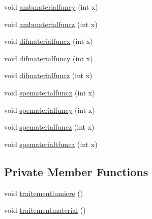 \begin{DoxyCompactItemize}
void \hyperlink{class_mondock_abab8b7116db8f4d8a45f97bbccfea28a}{ambmaterialfuncy} (int x)
\item 
void \hyperlink{class_mondock_aef75cf8b1bb4a9cf7e6f6a04ac9a6e53}{ambmaterialfuncz} (int x)
\item 
void \hyperlink{class_mondock_ab52fa4e602f9dd7686b4beaee1ae78a7}{difmaterialfuncx} (int x)
\item 
void \hyperlink{class_mondock_acb6ef6ce35644055c6782614193c0abf}{difmaterialfuncy} (int x)
\item 
void \hyperlink{class_mondock_a8ff74685d0e326198673395786ca80d4}{difmaterialfuncz} (int x)
\item 
void \hyperlink{class_mondock_ad62497d70cea045864c6f6dfa63f0a4c}{spematerialfuncx} (int x)
\item 
void \hyperlink{class_mondock_ada51acb02b3cb5d32e3982e93e2b2951}{spematerialfuncy} (int x)
\item 
void \hyperlink{class_mondock_aebe3927b8d0b1c6a703580cf69284405}{spematerialfuncz} (int x)
\item 
void \hyperlink{class_mondock_acfe377696276e313ee29188412cdefc5}{spematerialtfunca} (int x)
\end{DoxyCompactItemize}
\subsection*{Private Member Functions}
\begin{DoxyCompactItemize}
\item 
void \hyperlink{class_mondock_aea9fc6ea30f9958ac3a747552ecbed17}{traitementlumiere} ()
\item 
void \hyperlink{class_mondock_ab482a04624f22351da70e316fe9c8d4e}{traitementmaterial} ()
\end{DoxyCompactItemize}
